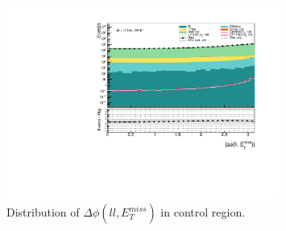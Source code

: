 \documentclass[12pt, a4paper]{book}
\begin{document}
\begin{figure}[!ht]
    \centering
        \includegraphics[width=0.8\textwidth]{dPhiLLMET.pdf}
    \caption{Distribution of $\Delta\phi(ll,E_T^{miss})$ in control region.}\label{fig:dPhiLLMET_dist}
\end{figure}
\end{document}
